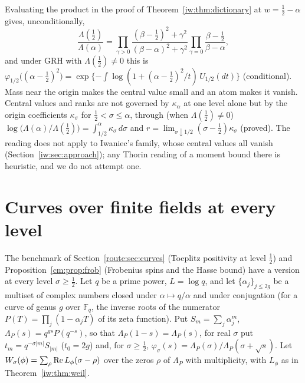 Evaluating the product in the proof of Theorem~\ref{iw:thm:dictionary} at $w=\frac12-\alpha$ gives, unconditionally,
\[
\frac{\Lambda(\frac12)}{\Lambda(\alpha)}=\prod_{\gamma>0}\frac{(\beta-\frac12)^2+\gamma^2}{(\beta-\alpha)^2+\gamma^2}\prod_{\gamma=0}\frac{\beta-\frac12}{\beta-\alpha},
\]
and under GRH with $\Lambda(\frac12)\ne0$ this is $\varphi_{1/2}\big((\alpha-\frac12)^2\big)=\exp\{-\int\log(1+(\alpha-\frac12)^2/t)\,U_{1/2}(dt)\}$ (conditional). Mass near the origin makes the central value small and an atom makes it vanish. Central values and ranks are not governed by $\kappa_\alpha$ at one level alone but by the origin coefficients $\kappa_\sigma$ for $\frac12<\sigma\le\alpha$, through (when $\Lambda(\frac12)\ne0$) $\log\big(\Lambda(\alpha)/\Lambda(\frac12)\big)=\int_{1/2}^\alpha\kappa_\sigma\,d\sigma$ and $r=\lim_{\sigma\downarrow1/2}(\sigma-\frac12)\kappa_\sigma$ (proved). The reading does not apply to Iwaniec's family, whose central values all vanish (Section~\ref{iw:sec:approach}); any Thorin reading of a moment bound there is heuristic, and we do not attempt one.

\section{Curves over finite fields at every level}\label{iw:sec:curves}

The benchmark of Section~\ref{route:sec:curves} (Toeplitz positivity at level $\frac12$) and Proposition~\ref{cm:prop:frob} (Frobenius spins and the Hasse bound) have a version at every level $\sigma\ge\frac12$. Let $q$ be a prime power, $L=\log q$, and let $\{\alpha_j\}_{j\le2g}$ be a multiset of complex numbers closed under $\alpha\mapsto q/\alpha$ and under conjugation (for a curve of genus $g$ over $\mathbb F_q$, the inverse roots of the numerator $P(T)=\prod_j(1-\alpha_jT)$ of its zeta function). Put $S_m=\sum_j\alpha_j^m$, $\Lambda_P(s)=q^{gs}P(q^{-s})$, so that $\Lambda_P(1-s)=\Lambda_P(s)$, for real $\sigma$ put $t_m=q^{-\sigma|m|}S_{|m|}$ ($t_0=2g$) and, for $\sigma\ge\frac12$, $\varphi_\sigma(s)=\Lambda_P(\sigma)/\Lambda_P(\sigma+\sqrt s)$. Let $W_\sigma(\phi)=\sum_\rho\operatorname{Re} L_\phi(\sigma-\rho)$ over the zeros $\rho$ of $\Lambda_P$ with multiplicity, with $L_\phi$ as in Theorem~\ref{iw:thm:weil}.

